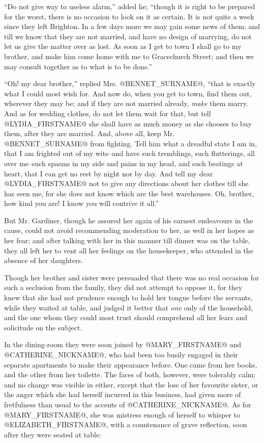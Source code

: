``Do not give way to useless alarm,'' added he; ``though it is right to be
prepared for the worst, there is no occasion to look on it as certain.
It is not quite a week since they left Brighton. In a few days more we
may gain some news of them; and till we know that they are not married,
and have no design of marrying, do not let us give the matter over as
lost. As soon as I get to town I shall go to my brother, and make
him come home with me to Gracechurch Street; and then we may consult
together as to what is to be done.''

``Oh! my dear brother,'' replied Mrs. @BENNET_SURNAME@, ``that is exactly what I
could most wish for. And now do, when you get to town, find them out,
wherever they may be; and if they are not married already, \textit{make} them
marry. And as for wedding clothes, do not let them wait for that, but
tell @LYDIA_FIRSTNAME@ she shall have as much money as she chooses to buy them,
after they are married. And, above all, keep Mr. @BENNET_SURNAME@ from fighting.
Tell him what a dreadful state I am in, that I am frighted out of my
wits--and have such tremblings, such flutterings, all over me--such
spasms in my side and pains in my head, and such beatings at heart, that
I can get no rest by night nor by day. And tell my dear @LYDIA_FIRSTNAME@ not to
give any directions about her clothes till she has seen me, for she does
not know which are the best warehouses. Oh, brother, how kind you are! I
know you will contrive it all.''

But Mr. Gardiner, though he assured her again of his earnest endeavours
in the cause, could not avoid recommending moderation to her, as well
in her hopes as her fear; and after talking with her in this manner till
dinner was on the table, they all left her to vent all her feelings on
the housekeeper, who attended in the absence of her daughters.

Though her brother and sister were persuaded that there was no real
occasion for such a seclusion from the family, they did not attempt to
oppose it, for they knew that she had not prudence enough to hold her
tongue before the servants, while they waited at table, and judged it
better that \textit{one} only of the household, and the one whom they could
most trust should comprehend all her fears and solicitude on the
subject.

In the dining-room they were soon joined by @MARY_FIRSTNAME@ and @CATHERINE_NICKNAME@, who had been
too busily engaged in their separate apartments to make their appearance
before. One came from her books, and the other from her toilette. The
faces of both, however, were tolerably calm; and no change was visible
in either, except that the loss of her favourite sister, or the anger
which she had herself incurred in this business, had given more of
fretfulness than usual to the accents of @CATHERINE_NICKNAME@. As for @MARY_FIRSTNAME@, she was
mistress enough of herself to whisper to @ELIZABETH_FIRSTNAME@, with a countenance
of grave reflection, soon after they were seated at table:


